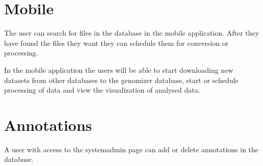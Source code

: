 \section{Mobile}
The user can search for files in the database in the mobile application. 
After they have found the files they want they can schedule them for conversion or processing.

In the mobile application the users will be able to start downloading new datasets from other databases to the genomizer database, start or schedule processing of data and view the visualization of analysed data.

\section{Annotations}
A user with access to the systemadmin page can add or delete annotations in the database.


